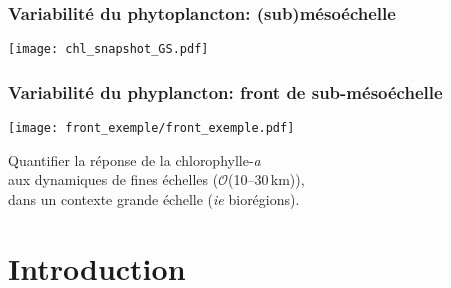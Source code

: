 \documentclass[11pt, french, aspectratio=32]{beamer}
\begin{document}

\begin{frame}
  \frametitle{Variabilité du phytoplancton: (sub)mésoéchelle}
    \texttt{[image: chl\_snapshot\_GS.pdf]}
    \\
\end{frame}



\begin{frame}
  \frametitle{Variabilité du phyplancton: front de sub-mésoéchelle}

  \texttt{[image: front\_exemple/front\_exemple.pdf]}
  \\

\end{frame}


\begin{frame}


  \vspace{3em}

  {
    \centering
    \begin{onehalfspacing}
      Quantifier la réponse de la chlorophylle-\textit{a}
      \\aux dynamiques de fines échelles (\(\mathcal{O}\)(10--30\,km)),
      \\dans un contexte grande échelle (\textit{ie} biorégions).
      \\
    \end{onehalfspacing}
  }
\end{frame}


\section*{Introduction}


\end{document}
